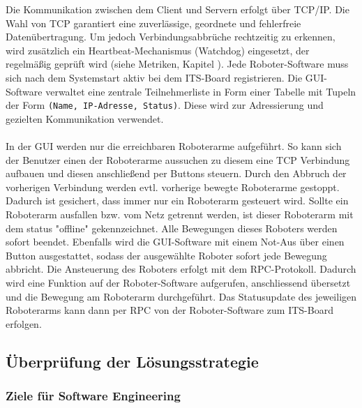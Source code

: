 Die Kommunikation zwischen dem Client und Servern erfolgt über TCP/IP. Die Wahl von TCP garantiert eine zuverlässige, geordnete und fehlerfreie Datenübertragung. Um jedoch Verbindungsabbrüche rechtzeitig zu erkennen, wird zusätzlich ein Heartbeat-Mechanismus (Watchdog) eingesetzt, der regelmäßig geprüft wird (siehe Metriken, Kapitel 
). Jede Roboter-Software muss sich nach dem Systemstart aktiv bei dem ITS-Board registrieren. Die GUI-Software verwaltet eine zentrale Teilnehmerliste in Form einer Tabelle mit Tupeln der Form \texttt{(Name, IP-Adresse, Status)}. Diese wird zur Adressierung und gezielten Kommunikation verwendet. %
\\\\
In der GUI werden nur die erreichbaren Roboterarme aufgeführt. So kann sich der Benutzer einen der Roboterarme aussuchen zu diesem eine TCP Verbindung aufbauen und diesen anschließend per Buttons steuern. Durch den Abbruch der vorherigen Verbindung werden evtl. vorherige bewegte Roboterarme gestoppt. Dadurch ist gesichert, dass immer nur ein Roboterarm gesteuert wird. Sollte ein Roboterarm ausfallen bzw. vom Netz getrennt werden, ist dieser Roboterarm mit dem status "offline" gekennzeichnet. Alle Bewegungen dieses Roboters werden sofort beendet. Ebenfalls wird die GUI-Software mit einem Not-Aus über einen Button ausgestattet, sodass der ausgewählte Roboter sofort jede Bewegung abbricht. Die Ansteuerung des Roboters erfolgt mit dem RPC-Protokoll. Dadurch wird eine Funktion auf der Roboter-Software aufgerufen, anschliessend übersetzt und die Bewegung am Roboterarm durchgeführt. Das Statusupdate des jeweiligen Roboterarms kann dann per RPC von der Roboter-Software zum ITS-Board erfolgen.


\subsection*{Überprüfung der Lösungsstrategie}
\subsubsection*{Ziele für Software Engineering}

